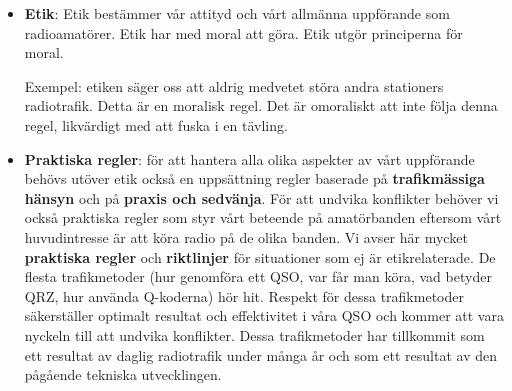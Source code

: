 \begin{itemize}
\item \textbf{Etik}: Etik bestämmer vår attityd och vårt allmänna uppförande
  som radioamatörer. Etik har med moral att göra. Etik utgör principerna
  för moral.

  Exempel: etiken säger oss att aldrig medvetet störa andra stationers
  radiotrafik. Detta är en moralisk regel. Det är omoraliskt att inte
  följa denna regel, likvärdigt med att fuska i en tävling.
\item \textbf{Praktiska regler}: för att hantera alla olika aspekter av
  vårt uppförande behövs utöver etik också en uppsättning regler baserade på
  \textbf{trafikmässiga hänsyn} och på \textbf{praxis och sedvänja}.
  För att undvika konflikter behöver vi också praktiska regler som styr
  vårt beteende på amatörbanden eftersom vårt huvudintresse är att köra
  radio på de olika banden. Vi avser här mycket \textbf{praktiska regler}
  och \textbf{riktlinjer} för situationer som ej är etikrelaterade.
  De flesta trafikmetoder (hur genomföra ett QSO, var får man köra,
  vad betyder QRZ, hur använda Q-koderna) hör hit. Respekt för dessa
  trafikmetoder säkerställer optimalt resultat och effektivitet i våra
  QSO och kommer att vara nyckeln till att undvika konflikter.
  Dessa trafikmetoder har tillkommit som ett resultat av daglig
  radiotrafik under många år och som ett resultat av den pågående
  tekniska utvecklingen.
\end{itemize}
